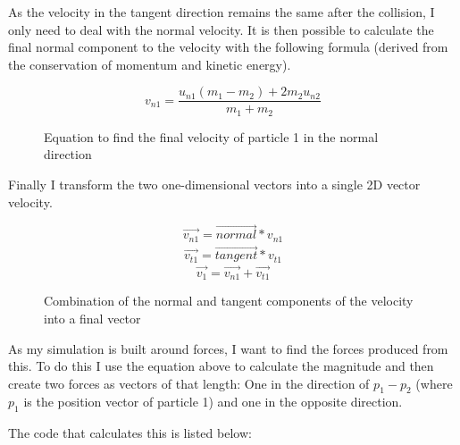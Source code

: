 	As the velocity in the tangent direction remains the same after the collision, I only need to deal with the normal velocity. It is then possible to calculate the final normal component to the velocity with the following formula (derived from the conservation of momentum and kinetic energy).
	\begin{figure}[h!]
		\begin{equation}
			v_{n1} = \frac{u_{n1}(m_1 - m_2) + 2 m_2 u_{n2}}{m_1+m_2}
		\end{equation}
		\caption{Equation to find the final velocity of particle 1 in the normal direction}
		\label{fig:colEqn}
	\end{figure}

	\newpage
	
	Finally I transform the two one-dimensional vectors into a single 2D vector velocity.
	
	\begin{figure}[h]
		\begin{equation}
			\vec{v_{n1}} = \vec{normal} * v_{n1}
		\end{equation}
		\begin{eqnarray}
			\vec{v_{t1}} = \vec{tangent} * v_{t1}
		\end{eqnarray}
		\begin{equation}
			\vec{v_1} = \vec{v_{n1}} + \vec{v_{t1}}
		\end{equation}
		\caption{Combination of the normal and tangent components of the velocity into a final vector}
		\label{fig:movEqn}
	\end{figure}

	As my simulation is built around forces, I want to find the forces produced from this. To do this I use the equation above to calculate the magnitude and then create two forces as vectors of that length: One in the direction of $p_1-p_2$ (where $p_1$ is the position vector of particle 1) and one in the opposite direction.

	The code that calculates this is listed below:
	
